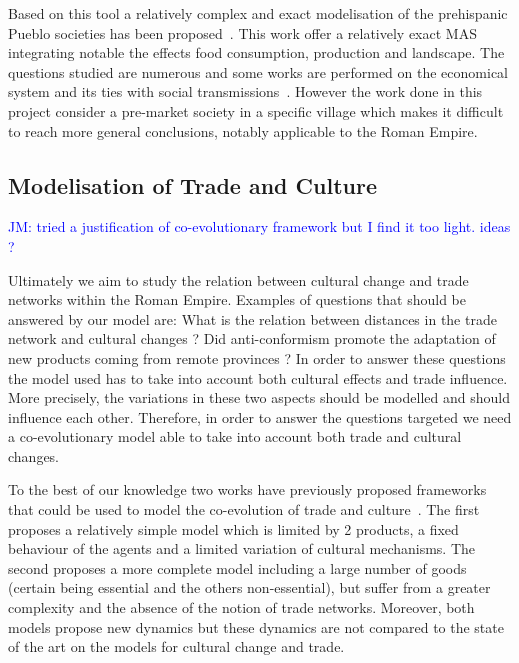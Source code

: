 \documentclass{wscpaperproc}
\newcommand{\memo}[2]{\textcolor{#1}{#2}}
\newcommand{\jm}[1]{\memo{blue}{JM: #1\\}}
\begin{document}
Based on this tool a relatively complex and exact modelisation of the prehispanic Pueblo societies has been proposed~\cite{kohler_modelling_2012}. This work offer a relatively exact MAS integrating notable the effects food consumption, production and landscape. The questions studied are  numerous and some works are performed on the economical system and its ties with social transmissions~\cite{kobti_emergence_2006,cockburn_simulating_2013}. However the work done in this project consider a pre-market society in a specific village which makes it difficult to reach more general conclusions, notably applicable to the Roman Empire.


\subsection{Modelisation of Trade and Culture}

\jm{tried a justification of co-evolutionary framework but I find it too light. ideas ?}

Ultimately we aim to study the relation between cultural change and trade networks within the Roman Empire. Examples of questions that should be answered by our model are: What is the relation between distances in the trade network and cultural changes ? Did anti-conformism promote the adaptation of new products coming from remote provinces ? In order to answer these questions the model used has to take into account both cultural effects and trade influence. More precisely, the variations in these two aspects should be modelled and should influence each other.  Therefore, in order to answer the questions targeted we need a co-evolutionary model able to take into account both trade and cultural changes.

To the best of our knowledge two works have previously proposed frameworks that could be used to model the co-evolution of trade and culture~\cite{bentley_specialisation_2005,macmillan_agent-based_2008}. The first proposes a relatively simple model which is limited by 2 products, a fixed behaviour of the agents and a limited variation of cultural mechanisms. The second proposes a more complete model including a large number of goods (certain being essential and the others non-essential), but suffer from a greater complexity and the absence of the notion of trade networks. Moreover, both models propose new dynamics but these dynamics are not compared to the state of the art on the models for cultural change and trade.
\end{document}
